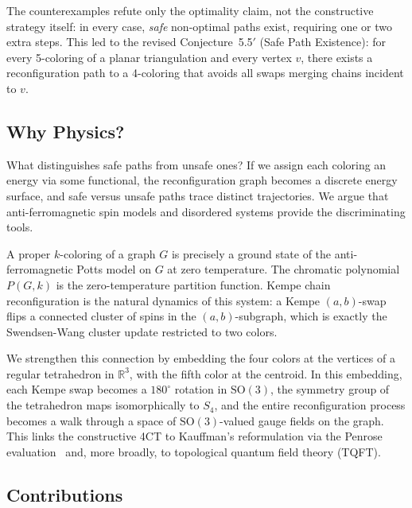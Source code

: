 The counterexamples refute only the optimality claim, not the
constructive strategy itself: in every case, \emph{safe} non-optimal paths
exist, requiring one or two extra steps. This led to the revised
Conjecture~5.5$'$ (Safe Path Existence): for every 5-coloring of a
planar triangulation and every vertex $v$, there exists a
reconfiguration path to a 4-coloring that avoids all swaps merging
chains incident to $v$.

\subsection{Why Physics?}

What distinguishes safe paths from unsafe ones? If we assign each
coloring an energy via some functional, the reconfiguration graph becomes
a discrete energy surface, and safe versus unsafe paths trace distinct
trajectories. We argue that anti-ferromagnetic spin models and disordered
systems provide the discriminating tools.

A proper $k$-coloring of a
graph $G$ is precisely a ground state of the anti-ferromagnetic Potts
model on $G$ at zero temperature. The chromatic polynomial $P(G, k)$ is
the zero-temperature partition function. Kempe chain reconfiguration is
the natural dynamics of this system: a Kempe $(a,b)$-swap flips a
connected cluster of spins in the $(a,b)$-subgraph, which is exactly
the Swendsen-Wang cluster update restricted to two colors.

We strengthen this connection by embedding the four colors at the
vertices of a regular tetrahedron in $\mathbb{R}^3$, with the fifth
color at the centroid. In this embedding, each Kempe swap becomes a
$180^\circ$ rotation in $\mathrm{SO}(3)$, the symmetry group of the
tetrahedron maps isomorphically to $S_4$, and the entire reconfiguration
process becomes a walk through a space of $\mathrm{SO}(3)$-valued gauge
fields on the graph. This links the constructive 4CT to Kauffman's reformulation via the
Penrose evaluation~\cite{kauffman1990} and, more broadly, to
topological quantum field theory (TQFT).

\subsection{Contributions}

